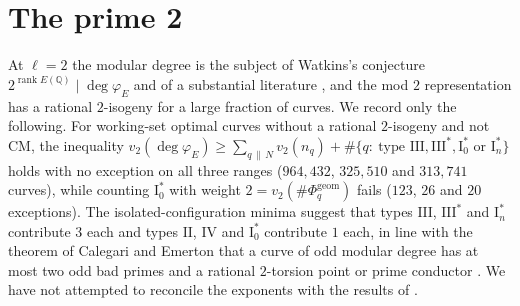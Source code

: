 \documentclass[11pt]{amsart}
\theoremstyle{definition}
\newcommand{\Q}{\mathbb{Q}}
\newcommand{\degphi}{\deg\varphi_E}
\newcommand{\Phig}{\Phi^{\mathrm{geom}}}
\begin{document}
\section{The prime 2}\label{sec:two}
At $\ell=2$ the modular degree is the subject of Watkins's conjecture $2^{\operatorname{rank}E(\Q)}\mid\degphi$ \cite{Watkins02} and of a substantial literature \cite{Dummigan06,CalegariEmerton09,Yazdani11,CaroPasten22,HatleyKundu,BKP}, and the mod $2$ representation has a rational $2$-isogeny for a large fraction of curves. We record only the following. For working-set optimal curves without a rational $2$-isogeny and not CM, the inequality $v_2(\degphi)\ge\sum_{q\,\|\,N}v_2(n_q)+\#\{q:\ \text{type }\mathrm{III},\mathrm{III}^*,\mathrm{I}_0^*\text{ or }\mathrm{I}_n^*\}$ holds with no exception on all three ranges ($964{,}432$, $325{,}510$ and $313{,}741$ curves), while counting $\mathrm{I}_0^*$ with weight $2=v_2(\#\Phig_q)$ fails ($123$, $26$ and $20$ exceptions). The isolated-configuration minima suggest that types $\mathrm{III}$, $\mathrm{III}^*$ and $\mathrm{I}_n^*$ contribute $3$ each and types $\mathrm{II}$, $\mathrm{IV}$ and $\mathrm{I}_0^*$ contribute $1$ each, in line with the theorem of Calegari and Emerton that a curve of odd modular degree has at most two odd bad primes and a rational $2$-torsion point or prime conductor \cite{CalegariEmerton09}. We have not attempted to reconcile the exponents with the results of \cite{Dummigan06,CaroPasten22,HatleyKundu,BKP}.
\end{document}
